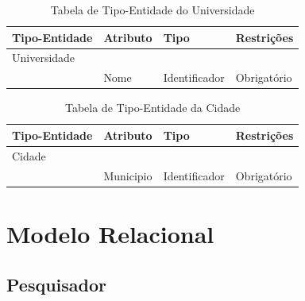 \documentclass[11pt]{../../classes/ifscarticle}
\begin{document}
\begin{table}[h]
    \centering
    \vspace{0.5cm}
    \begin{tabular}{ p{}|p{3cm}|p{4cm}|p{}|  }


        Tipo-Entidade & Atributo & Tipo          & Restrições                                                      \\ %
        \hline
        Universidade
                      &          &               &                                                                 \\
                      & Nome     & Identificador & Obrigatório                                          \linebreak \\
        \hline
    \end{tabular}
    \caption{Tabela de Tipo-Entidade do Universidade}
\end{table}


\begin{table}[h]
    \centering
    \vspace{0.5cm}
    \begin{tabular}{ p{}|p{3cm}|p{4cm}|p{}|  }


        Tipo-Entidade & Atributo  & Tipo          & Restrições                                                      \\ %
        \hline
        Cidade
                      &           &               &                                                                 \\
                      & Municipio & Identificador & Obrigatório                                          \linebreak \\
        \hline
    \end{tabular}
    \caption{Tabela de Tipo-Entidade da Cidade}
\end{table}

\clearpage

\section{Modelo Relacional}
\subsection{Pesquisador}
\end{document}

